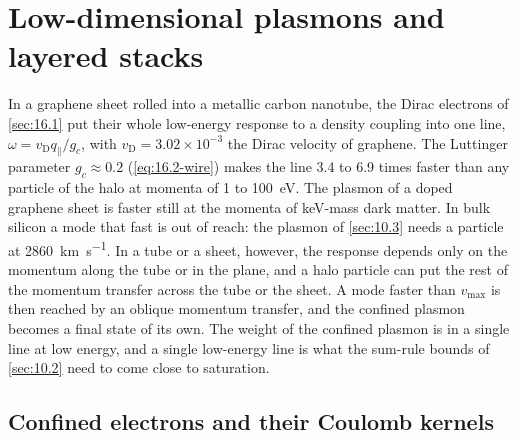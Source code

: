 \section{Low-dimensional plasmons and layered stacks}\label{sec:16.2}

In a graphene sheet rolled into a metallic carbon nanotube, the Dirac electrons of \cref{sec:16.1} put their whole low-energy response to a density coupling into one line, $\omega = v_{\mathrm{D}}q_\parallel/g_c$, with $v_{\mathrm{D}} = 3.02\times10^{-3}$ the Dirac velocity of graphene. The Luttinger parameter $g_c \approx 0.2$ (\cref{eq:16.2-wire}) makes the line 3.4 to 6.9 times faster than any particle of the halo at momenta of 1 to \SI{100}{eV}. The plasmon of a doped graphene sheet is faster still at the momenta of keV-mass dark matter. In bulk silicon a mode that fast is out of reach: the plasmon of \cref{sec:10.3} needs a particle at \SI{2860}{km.s^{-1}}. In a tube or a sheet, however, the response depends only on the momentum along the tube or in the plane, and a halo particle can put the rest of the momentum transfer across the tube or the sheet. A mode faster than $v_{\mathrm{max}}$ is then reached by an oblique momentum transfer, and the confined plasmon becomes a final state of its own. The weight of the confined plasmon is in a single line at low energy, and a single low-energy line is what the sum-rule bounds of \cref{sec:10.2} need to come close to saturation.

\subsection{Confined electrons and their Coulomb kernels}\label{sec:16.2-kernels}

